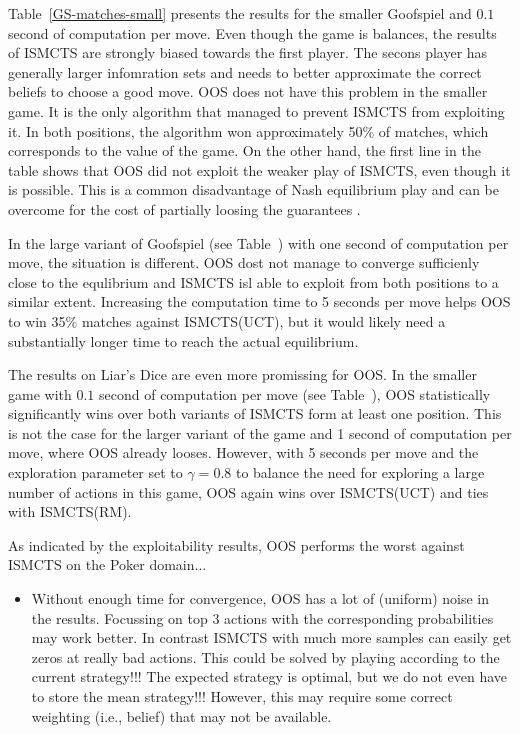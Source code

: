 \documentclass{aamas2015}
\begin{document}
Table~\ref{GS-matches-small} presents the results for the smaller Goofspiel and $0.1$ second of computation per move. Even though the game is balances, the results of ISMCTS are strongly biased towards the first player. The secons player has generally larger infomration sets and needs to better approximate the correct beliefs to choose a good move. OOS does not have this problem in the smaller game. It is the only algorithm that managed to prevent ISMCTS from exploiting it.
In both positions, the algorithm won approximately 50\% of matches, which corresponds to the value of the game.
On the other hand, the first line in the table shows that OOS did not exploit the weaker play of ISMCTS, even though it is possible. This is a common disadvantage of Nash equilibrium play \cite{} and can be overcome for the cost of partially loosing the guarantees \cite{RNR}.

In the large variant of Goofspiel (see Table~\cite{GS-matches-small}) with one second of computation per move, the situation is different. OOS dost not manage to converge sufficienly close to the equlibrium and ISMCTS isl able to exploit from both positions to a similar extent. Increasing the computation time to 5 seconds per move helps OOS to win 35\% matches against ISMCTS(UCT), but it would likely need a substantially longer time to reach the actual equilibrium.

The results on Liar's Dice are even more promissing for OOS. In the smaller game with $0.1$ second of computation per move (see Table~\cite{LD-matches-small}), OOS statistically significantly wins over both variants of ISMCTS form at least one position. This is not the case for the larger variant of the game and 1 second of computation per move, where OOS already looses. However, with 5 seconds per move and the exploration parameter set to $\gamma=0.8$ to balance the need for exploring a large number of actions in this game, OOS again wins over ISMCTS(UCT) and ties with ISMCTS(RM).

As indicated by the exploitability results, OOS performs the worst against ISMCTS on the Poker domain...





\begin{itemize}
\item Without enough time for convergence, OOS has a lot of  (uniform) noise in the results. Focussing on top 3 actions with the corresponding probabilities may work better. In contrast ISMCTS with much more samples can easily get zeros at really bad actions. This could be solved by playing according to the current strategy!!! The expected strategy is optimal, but we do not even have to store the mean strategy!!! However, this may require some correct weighting (i.e., belief) that may not be available.
\end{itemize}
\end{document}
